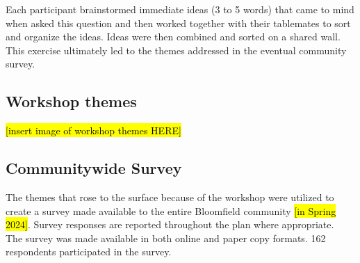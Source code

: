 \noindent Each participant brainstormed immediate ideas (3 to 5 words) that came to mind when asked this question and then worked together with their tablemates to sort and organize the ideas. Ideas were then combined and sorted on a shared wall. This exercise ultimately led to the themes addressed in the eventual community survey.\\

\subsection*{Workshop themes}

\noindent \hl{[insert image of workshop themes HERE]}

\subsection{Communitywide Survey}

\noindent The themes that rose to the surface because of the workshop were utilized to create a survey made available to the entire Bloomfield community \hl{[in Spring 2024]}. Survey responses are reported throughout the plan where appropriate.\\

\noindent The survey was made available in both online and paper copy formats. 162 respondents participated in the survey.

